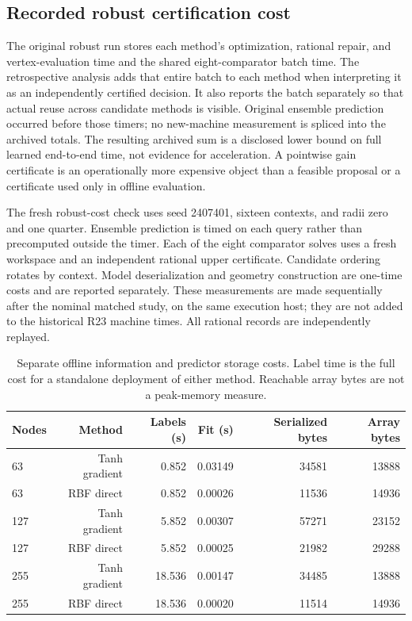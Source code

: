 \documentclass[11pt,letterpaper]{article}
\theoremstyle{definition}
\newcommand{\1}{\mathbf 1}
\begin{document}
\subsection{Recorded robust certification cost}
The original robust run stores each method's optimization, rational repair,
and vertex-evaluation time and the shared eight-comparator batch time. The
retrospective analysis adds that entire batch to each method when interpreting
it as an independently certified decision. It also reports the batch
separately so that actual reuse across candidate methods is visible. Original
ensemble prediction occurred before those timers; no new-machine measurement
is spliced into the archived totals. The resulting archived sum is a disclosed
lower bound on full learned end-to-end time, not evidence for acceleration.
A pointwise gain certificate is an operationally more expensive object than a
feasible proposal or a certificate used only in offline evaluation.



The fresh robust-cost check uses seed 2407401, sixteen contexts, and radii zero
and one quarter. Ensemble prediction is timed on each query rather than
precomputed outside the timer. Each of the eight comparator solves uses a
fresh workspace and an independent rational upper certificate. Candidate
ordering rotates by context. Model deserialization and geometry construction
are one-time costs and are reported separately. These measurements are made
sequentially after the nominal matched study, on the same execution host;
they are not added to the historical R23 machine times. All rational records
are independently replayed.

\begin{table}[tbp]\centering\scriptsize
\caption{Separate offline information and predictor storage costs. Label time is the full cost for a standalone deployment of either method. Reachable array bytes are not a peak-memory measure.}
\label{tab:r24-offline}
\begin{tabular}{lrrrrr}
\toprule
Nodes & Method & Labels (s) & Fit (s) & Serialized bytes & Array bytes\\
\midrule
63 & Tanh gradient & 0.852 & 0.03149 & 34581 & 13888\\
63 & RBF direct & 0.852 & 0.00026 & 11536 & 14936\\
127 & Tanh gradient & 5.852 & 0.00307 & 57271 & 23152\\
127 & RBF direct & 5.852 & 0.00025 & 21982 & 29288\\
255 & Tanh gradient & 18.536 & 0.00147 & 34485 & 13888\\
255 & RBF direct & 18.536 & 0.00020 & 11514 & 14936\\
\bottomrule
\end{tabular}
\end{table}
\end{document}
